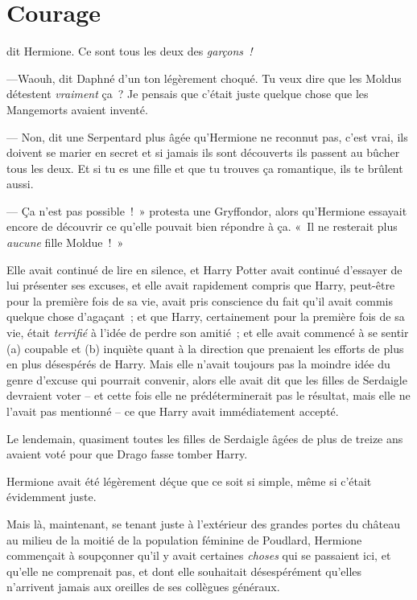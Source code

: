 \chapter{Courage}

 dit Hermione. Ce sont tous les deux des \emph{garçons~!}

\hplettrineextrapara
---Waouh, dit Daphné d'un ton légèrement choqué. Tu veux dire que les Moldus détestent \emph{vraiment} ça~? Je pensais que c'était juste quelque chose que les Mangemorts avaient inventé.

--- Non, dit une Serpentard plus âgée qu'Hermione ne reconnut pas, c'est vrai, ils doivent se marier en secret et si jamais ils sont découverts ils passent au bûcher tous les deux. Et si tu es une fille et que tu trouves ça romantique, ils te brûlent aussi.

--- Ça n'est pas possible~!~» protesta une Gryffondor, alors qu'Hermione essayait encore de découvrir ce qu'elle pouvait bien répondre à ça. «~Il ne resterait plus \emph{aucune} fille Moldue~!~»

Elle avait continué de lire en silence, et Harry Potter avait continué d'essayer de lui présenter ses excuses, et elle avait rapidement compris que Harry, peut-être pour la première fois de sa vie, avait pris conscience du fait qu'il avait commis quelque chose d'agaçant~; et que Harry, certainement pour la première fois de sa vie, était \emph{terrifié} à l'idée de perdre son amitié~; et elle avait commencé à se sentir (a) coupable et (b) inquiète quant à la direction que prenaient les efforts de plus en plus désespérés de Harry. Mais elle n'avait toujours pas la moindre idée du genre d'excuse qui pourrait convenir, alors elle avait dit que les filles de Serdaigle devraient voter -- et cette fois elle ne prédéterminerait pas le résultat, mais elle ne l'avait pas mentionné -- ce que Harry avait immédiatement accepté.

Le lendemain, quasiment toutes les filles de Serdaigle âgées de plus de treize ans avaient voté pour que Drago fasse tomber Harry.

Hermione avait été légèrement déçue que ce soit si simple, même si c'était évidemment juste.

Mais là, maintenant, se tenant juste à l'extérieur des grandes portes du château au milieu de la moitié de la population féminine de Poudlard, Hermione commençait à soupçonner qu'il y avait certaines \emph{choses} qui se passaient ici, et qu'elle ne comprenait pas, et dont elle souhaitait désespérément qu'elles n'arrivent jamais aux oreilles de ses collègues généraux.

